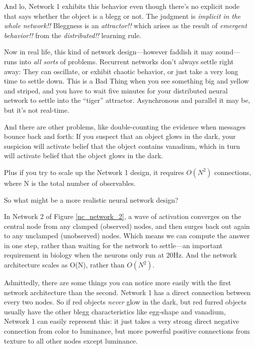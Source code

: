 {{{
 And lo, Network 1 exhibits this behavior even though
there's no explicit node that says whether the object
is a blegg or not. The judgment is \textit{implicit in the whole
network!!} Bleggness is an \textit{attractor!!} which arises as the
result of \textit{emergent behavior!!} from the \textit{distributed!!}
learning rule.}

{
 Now in real life, this kind of network design---however faddish it
may sound---runs into \textit{all sorts} of problems. Recurrent
networks don't always settle right away: They can
oscillate, or exhibit chaotic behavior, or just take a very long time
to settle down. This is a Bad Thing when you see something big and
yellow and striped, and you have to wait five minutes for your
distributed neural network to settle into the
``tiger'' attractor. Asynchronous
and parallel it may be, but it's not real-time.}

{
 And there are other problems, like double-counting the evidence
when messages bounce back and forth: If you suspect that an object
glows in the dark, your suspicion will activate belief that the object
contains vanadium, which in turn will activate belief that the object
glows in the dark.}

{
 Plus if you try to scale up the Network 1 design, it requires
$O(N^{2})$ connections, where N is the total number of
observables.}

{
 So what might be a more realistic neural network design?}


{
 In Network 2 of Figure \ref{nc_network_2}, a wave of activation converges on
the central node from any clamped (observed) nodes, and then surges
back out again to any unclamped (unobserved) nodes. Which means we can
compute the answer in one step, rather than waiting for the network to
settle---an important requirement in biology when the neurons only run
at 20Hz. And the network architecture scales as O(N), rather than
$O(N^{2})$.}

{
 Admittedly, there are some things you can notice more easily with
the first network architecture than the second. Network 1 has a direct
connection between every two nodes. So if red objects \textit{never}
glow in the dark, but red furred objects usually have the other blegg
characteristics like egg-shape and vanadium, Network 1 can easily
represent this: it just takes a very strong direct negative connection
from color to luminance, but more powerful positive connections from
texture to all other nodes except luminance.}

}}
